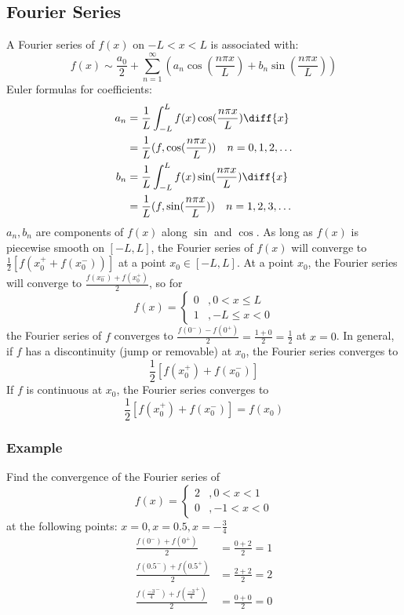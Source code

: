 \documentclass{math}
\begin{document}
\subsection*{Fourier Series}
A Fourier series of \( f(x) \) on \( -L<x<L \) is associated with:
\[ f(x) \sim \frac{a_0}{2}+\sum_{n=1}^{\infty}(a_n\cos(\frac{n\pi x}{L})+
b_n\sin(\frac{n\pi x}{L})) \]
Euler formulas for coefficients:
\begin{align*}
  a_n &= \frac{1}{L}\int_{-L}^{L}f(x)\cos(\frac{n\pi x}{L})\diff{x} \\
  &= \frac{1}{L}(f,\cos(\frac{n\pi x}{L})) \quad n = 0,1,2,\dots \\
  b_n &= \frac{1}{L}\int_{-L}^{L}f(x)\sin(\frac{n\pi x}{L})\diff{x} \\
  &= \frac{1}{L}(f,\sin(\frac{n\pi x}{L})) \quad n = 1,2,3,\dots
\end{align*}
\( a_n,b_n \) are components of \( f(x) \) along \( \sin \) and \( \cos \).
As long as \( f(x) \) is piecewise smooth on \( [-L,L] \), the Fourier series
of \( f(x) \) will converge to \( \frac{1}{2}[f(x_0^++f(x_0^-))] \) at a point
\( x_0\in[-L,L] \). At a point \( x_0 \), the Fourier series will converge to
\( \frac{f(x_0^-)+f(x_0^+)}{2} \), so for
\[ f(x) = \begin{cases}
  0 &, 0<x\le L \\
  1 &, -L\le x<0
\end{cases} \]
the Fourier series of \( f \) converges to \( \frac{f(0^-)-f(0^+)}{2} =
\frac{1+0}{2} = \frac{1}{2} \) at \( x = 0 \). In general, if \( f \) has a
discontinuity (jump or removable) at \( x_0 \), the Fourier series converges to
\[ \frac{1}{2}[f(x_0^+)+f(x_0^-)] \]
If \( f \) is continuous at \( x_0 \), the Fourier series converges to
\[ \frac{1}{2}[f(x_0^+)+f(x_0^-)] = f(x_0) \]

\subsubsection*{Example}
Find the convergence of the Fourier series of
\[ f(x) = \begin{cases}
  2 &, 0<x<1 \\
  0 &, -1<x<0
\end{cases} \]
at the following points: \( x = 0, x = 0.5, x = -\frac{3}{4} \)
\begin{align*}
  \frac{f(0^-)+f(0^+)}{2} &= \frac{0+2}{2} = 1 \\
  \frac{f(0.5^-)+f(0.5^+)}{2} &= \frac{2+2}{2} = 2 \\
  \frac{f(\frac{-3}{4}^-)+f(\frac{-3}{4}^+)}{2} &= \frac{0+0}{2} = 0
\end{align*}
\end{document}
